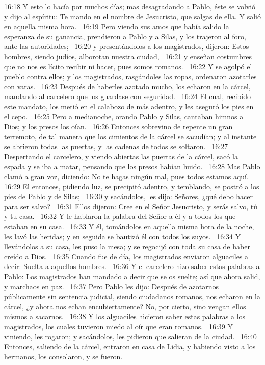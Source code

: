 16:18 Y esto lo hacía por muchos días; mas desagradando a Pablo, éste se volvió y dijo al espíritu: Te mando en el nombre de Jesucristo, que salgas de ella. Y salió en aquella misma hora.  
16:19 Pero viendo sus amos que había salido la esperanza de su ganancia, prendieron a Pablo y a Silas, y los trajeron al foro, ante las autoridades;  
16:20 y presentándolos a los magistrados, dijeron: Estos hombres, siendo judíos, alborotan nuestra ciudad,  
16:21 y enseñan costumbres que no nos es lícito recibir ni hacer, pues somos romanos.  
16:22 Y se agolpó el pueblo contra ellos; y los magistrados, rasgándoles las ropas, ordenaron azotarles con varas.  
16:23 Después de haberles azotado mucho, los echaron en la cárcel, mandando al carcelero que los guardase con seguridad.  
16:24 El cual, recibido este mandato, los metió en el calabozo de más adentro, y les aseguró los pies en el cepo.  
16:25 Pero a medianoche, orando Pablo y Silas, cantaban himnos a Dios; y los presos los oían.  
16:26 Entonces sobrevino de repente un gran terremoto, de tal manera que los cimientos de la cárcel se sacudían; y al instante se abrieron todas las puertas, y las cadenas de todos se soltaron.  
16:27 Despertando el carcelero, y viendo abiertas las puertas de la cárcel, sacó la espada y se iba a matar, pensando que los presos habían huido.  
16:28 Mas Pablo clamó a gran voz, diciendo: No te hagas ningún mal, pues todos estamos aquí.  
16:29 El entonces, pidiendo luz, se precipitó adentro, y temblando, se postró a los pies de Pablo y de Silas;  
16:30 y sacándolos, les dijo: Señores, ¿qué debo hacer para ser salvo?  
16:31 Ellos dijeron: Cree en el Señor Jesucristo, y serás salvo, tú y tu casa.  
16:32 Y le hablaron la palabra del Señor a él y a todos los que estaban en su casa.  
16:33 Y él, tomándolos en aquella misma hora de la noche, les lavó las heridas; y en seguida se bautizó él con todos los suyos.  
16:34 Y llevándolos a su casa, les puso la mesa; y se regocijó con toda su casa de haber creído a Dios.  
16:35 Cuando fue de día, los magistrados enviaron alguaciles a decir: Suelta a aquellos hombres.  
16:36 Y el carcelero hizo saber estas palabras a Pablo: Los magistrados han mandado a decir que se os suelte; así que ahora salid, y marchaos en paz.  
16:37 Pero Pablo les dijo: Después de azotarnos públicamente sin sentencia judicial, siendo ciudadanos romanos, nos echaron en la cárcel, ¿y ahora nos echan encubiertamente? No, por cierto, sino vengan ellos mismos a sacarnos.  
16:38 Y los alguaciles hicieron saber estas palabras a los magistrados, los cuales tuvieron miedo al oír que eran romanos.  
16:39 Y viniendo, les rogaron; y sacándolos, les pidieron que salieran de la ciudad.  
16:40 Entonces, saliendo de la cárcel, entraron en casa de Lidia, y habiendo visto a los hermanos, los consolaron, y se fueron.  
